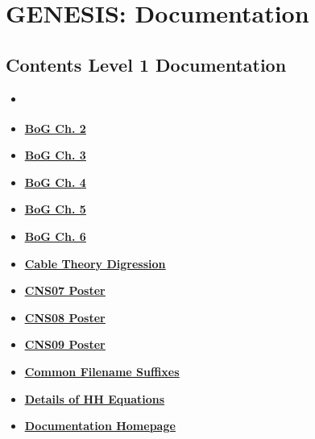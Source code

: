 \documentclass[12pt]{article}
\begin{document}
\section*{GENESIS: Documentation}

\subsection*{Contents Level 1 Documentation}

\begin{itemize}

\item \href{../tutorial-jaeger/tutorial-jaeger.pdf}{\bf \underline{}}

\item \href{../bog-ch2/bog-ch2.pdf}{\bf \underline{BoG Ch. 2}}

\item \href{../bog-ch3/bog-ch3.pdf}{\bf \underline{BoG Ch. 3}}

\item \href{../bog-ch4/bog-ch4.pdf}{\bf \underline{BoG Ch. 4}}

\item \href{../bog-ch5/bog-ch5.pdf}{\bf \underline{BoG Ch. 5}}

\item \href{../bog-ch6/bog-ch6.pdf}{\bf \underline{BoG Ch. 6}}

\item \href{../cable-theory-digression/cable-theory-digression.pdf}{\bf \underline{Cable Theory Digression}}

\item \href{../CNS07/CNS07.pdf}{\bf \underline{CNS07 Poster}}

\item \href{../CNS08/CNS08.pdf}{\bf \underline{CNS08 Poster}}

\item \href{../CNS09/CNS09.pdf}{\bf \underline{CNS09 Poster}}

\item \href{../common-suffixes/common-suffixes.pdf}{\bf \underline{Common Filename Suffixes}}

\item \href{../hh-model-details/hh-model-details.pdf}{\bf \underline{Details of HH Equations}}

\item \href{../documentation-homepage/documentation-homepage.pdf}{\bf \underline{Documentation Homepage}}


\end{itemize}
\end{document}
